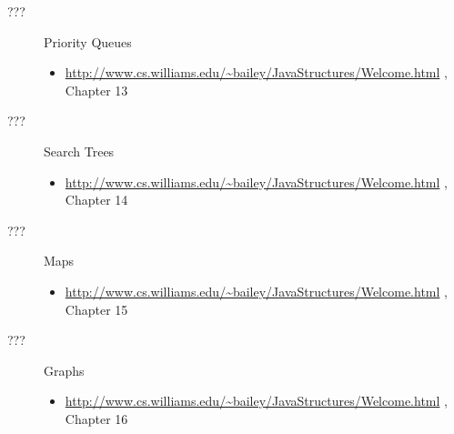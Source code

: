 \documentclass{article}
\newcommand{\bailey}{
  \url{http://www.cs.williams.edu/~bailey/JavaStructures/Welcome.html}
  }
\begin{document}
\begin{description}
\item[???] Priority Queues
  \begin{itemize}
  \item \bailey, Chapter 13
  \end{itemize}

\item[???] Search Trees
  \begin{itemize}
  \item \bailey, Chapter 14
  \end{itemize}

\item[???] Maps
  \begin{itemize}
  \item \bailey, Chapter 15
  \end{itemize}

\item[???] Graphs
  \begin{itemize}
  \item \bailey, Chapter 16
  \end{itemize}
  

\end{description}
\end{document}
